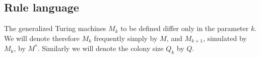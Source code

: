 \documentclass[11pt]{memoir}
\theoremstyle{definition} %
\renewcommand{\vek}[1]{\mathbf{#1}}
\newcommand{\va}{\vek{a}} %
\newcommand{\Q}{Q} %
\begin{document}




\subsection{Rule language}\label{sec:language}

The generalized Turing machines \( M_{k} \) to be defined
differ only in the parameter \( k \).
We will denote therefore \( M_{k} \) frequently simply by \( M \),
and \( M_{k+1} \), simulated by \( M_{k} \),  by \( M^{*} \).
Similarly we will denote the colony size \( \Q_{k} \) by \( \Q \).
\end{document}
